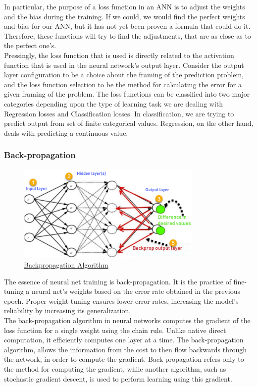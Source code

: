 In particular, the purpose of a loss function in an ANN is to adjust the weights and the bias during the training. If we could, we would find the perfect weights and bias for our ANN, but it has not yet been proven a formula that could do it. Therefore, these functions will try to find the adjustments, that are as close as to the perfect one's. \\

Pressingly, the loss function that is used is directly related to the activation function that is used in the neural network's output layer. Consider the output layer configuration to be a choice about the framing of the prediction problem, and the loss function selection to be the method for calculating the error for a given framing of the problem. The loss functions can be classified into two major categories depending upon the type of learning task we are dealing with Regression losses and Classification losses. In classification, we are trying to predict output from set of finite categorical values. Regression, on the other hand, deals with predicting a continuous value.

\subsubsection*{Back-propagation}

 \begin{figure}[h]
	\centering
	\includegraphics[width=0.8\textwidth]{figures/background/Backpropagation.png}
	\captionsetup{labelformat=empty}
	\caption{\href{https://www.guru99.com/images/1/030819_0937_BackPropaga1.png}
	{Backpropagation Algorithm}}
\end{figure}


The essence of neural net training is back-propagation. It is the practice of fine-tuning a neural net's weights based on the error rate obtained in the previous epoch. Proper weight tuning ensures lower error rates, increasing the model's reliability by increasing its generalization. \\

The back-propagation algorithm in neural networks computes the gradient of the loss function for a single weight using the chain rule. Unlike native direct computation, it efficiently computes one layer at a time. The back-propagation algorithm, allows the information from the cost to then flow backwards through the network, in order to compute the gradient. Back-propagation refers only to the method for computing the gradient, while another algorithm,
such as stochastic gradient descent, is used to perform learning using this gradient.

